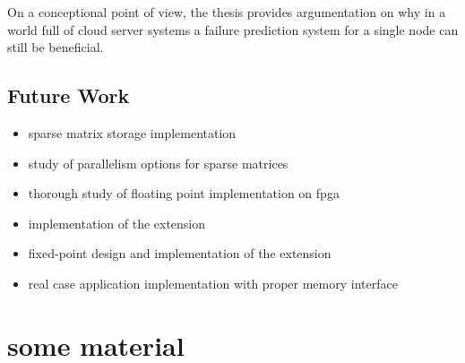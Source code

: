 \documentclass[mscthesis]{usiinfthesis}
\begin{document}
On a conceptional point of view, the thesis provides argumentation on why
in a world full of cloud server systems a failure prediction system for a single
node can still be beneficial.

\section{Future Work}
\label{ch:conc_work}

\begin{itemize}
    \item sparse matrix storage implementation
    \item study of parallelism options for sparse matrices
    \item thorough study of floating point implementation on \gls{fpga}
    \item implementation of the extension
    \item fixed-point design and implementation of the extension
    \item real case application implementation with proper memory interface
\end{itemize}

\nocite{*}

\appendix %

\chapter{some material}

\backmatter


%
%
%
%
%

%

\printglossaries

\end{document}
